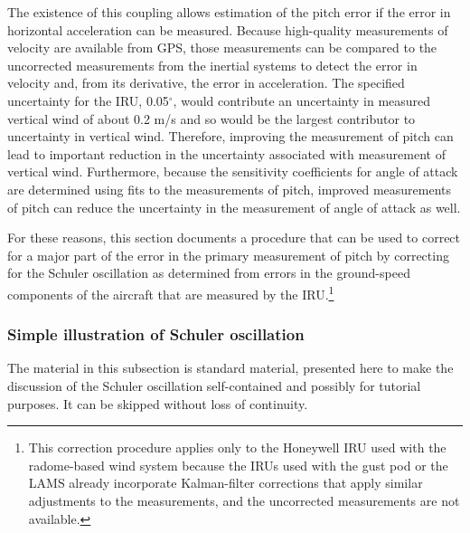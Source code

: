 \documentclass[12pt,twoside,english]{article}\usepackage[]{graphicx}\usepackage[]{color}
\let\OrgIndex\index
\renewcommand*{\index}[1]{\OrgIndex{#1}}
\begin{document}
The existence of this coupling allows estimation of the pitch error if the error in horizontal acceleration can be measured. Because high-quality measurements of velocity are available from GPS, those measurements can be compared to the uncorrected measurements from the inertial systems to detect the error in velocity and, from its derivative, the error in acceleration. The specified uncertainty for the IRU, 0.05$^{\circ}$, would contribute an uncertainty in measured vertical wind of about 0.2 m/s and so would be the largest contributor to uncertainty in vertical wind. Therefore, improving the measurement of pitch can lead to important reduction in the uncertainty associated with measurement of vertical wind. 
Furthermore, because the sensitivity coefficients for angle of attack are determined using fits to the measurements of pitch, improved measurements of pitch can reduce the uncertainty in the measurement of angle of attack as well.

For these reasons, this section documents a procedure that can be used to correct for a major part of the error in the primary measurement of pitch by correcting for the Schuler oscillation as determined from errors in the ground-speed components of the aircraft that are measured by the IRU.\footnote{This correction procedure applies only to the Honeywell IRU used with the radome-based wind system because the IRUs used with the gust pod or the LAMS already incorporate Kalman-filter corrections that apply similar adjustments to the measurements, and the uncorrected measurements are not available.}



\subsubsection{Simple illustration of Schuler oscillation}

The material in this subsection is standard material, presented here to make the discussion of the Schuler oscillation self-contained and possibly for tutorial purposes. It can be skipped without loss of continuity.
\end{document}
